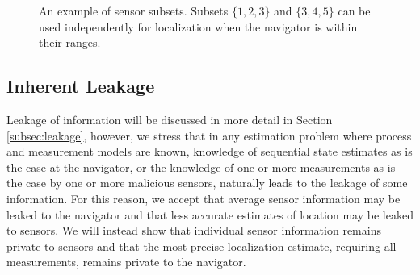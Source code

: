 \documentclass[10pt,letterpaper,oneside,twocolumn,journal]{IEEEtran}
\theoremstyle{definition}
\theoremstyle{definition}
\theoremstyle{remark}
\begin{document}
\begin{figure}[htbp]
\caption{An example of sensor subsets. Subsets $\{1,2,3\}$ and $\{3,4,5\}$ can be used independently for localization when the navigator is within their ranges.}
\label{fig:sensor_subsets}
\end{figure}

% 
% 

\subsection{Inherent Leakage}
Leakage of information will be discussed in more detail in Section \ref{subsec:leakage}, however, we stress that in any estimation problem where process and measurement models are known, knowledge of sequential state estimates as is the case at the navigator, or the knowledge of one or more measurements as is the case by one or more malicious sensors, naturally leads to the leakage of some information. For this reason, we accept that average sensor information may be leaked to the navigator and that less accurate estimates of location may be leaked to sensors. We will instead show that individual sensor information remains private to sensors and that the most precise localization estimate, requiring all measurements, remains private to the navigator. 
\end{document}
